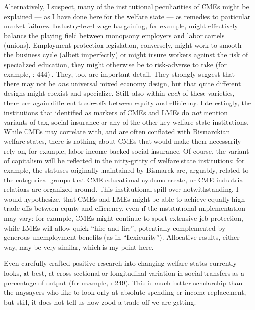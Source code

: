 \begin{enumerate}
{		Alternatively, I suspect, many of the institutional peculiarities of \glspl{CME} might be explained --- as I have done here for the welfare state --- as remedies to particular market failures. Industry-level wage bargaining, for example, might effectively balance the playing field between monopsony employers and labor cartels (unions). Employment protection legislation, conversely, might work to smooth the business cycle (albeit imperfectly) or might insure workers against the risk of specialized education, they might otherwise be to risk-adverse to take (for example, \citealt{Offe2003}: 444).}.
	They, too, are important detail. They strongly suggest that there may not be \emph{one} universal mixed economy design, but that quite different designs might coexist and specialize. Still, also within \emph{each} of these varieties, there are again different trade-offs between equity and efficiency. Interestingly, the institutions that \citeauthor{HallSoskice-2001-aa} identified as markers of \glspl{CME} and \glspl{LME} do \emph{not} mention variants of tax, social insurance or any of the other key welfare state institutions. While \glspl{CME} may correlate with, and are often conflated with Bismarckian welfare states, there is nothing about \glspl{CME} that would make them necessarily rely on, for example, labor income-backed social insurance. Of course, the variant of capitalism will be reflected in the nitty-gritty of welfare state institutions: for example, the statuses originally maintained by Bismarck are, arguably, related to the categorical groups that \gls{CME} educational systems create, or \gls{CME} industrial relations are organized around. This institutional spill-over notwithstanding, I would hypothesize, that \glspl{CME} and \glspl{LME} might be able to achieve equally high trade-offs between equity and efficiency, even if the institutional implementation may vary: for example, \glspl{CME} might continue to sport extensive job protection, while \glspl{LME} will allow quick ``hire and fire'', potentially complemented by generous unemployment benefits (as in ``flexicurity''). Allocative results, either way, may be very similar, which is my point here.

	Even carefully crafted positive research into changing welfare states currently looks, at best, at cross-sectional or longitudinal variation in social transfers as a percentage of output (for example, \citealt{Ravenhill2005}: 249). This is much better scholarship than the naysayers who like to look only at absolute spending or income replacement, but still, it does not tell us how good a trade-off we are getting.


\end{enumerate}
